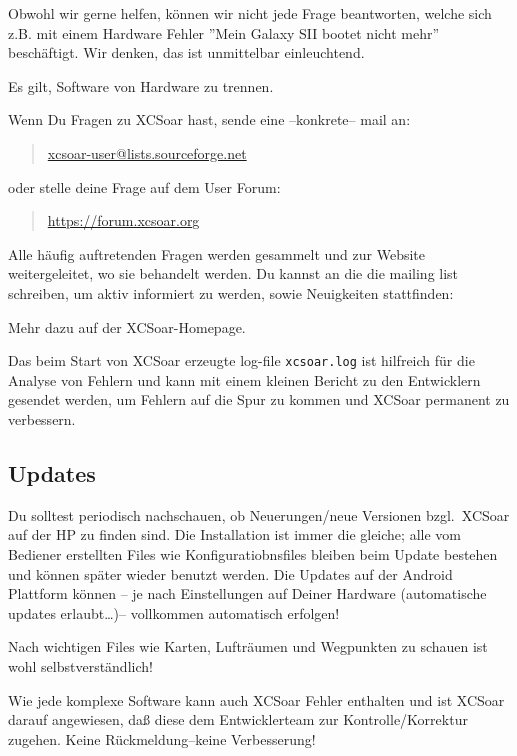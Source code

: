 Obwohl wir gerne helfen, können wir nicht jede Frage beantworten, welche sich z.B. mit einem 
Hardware Fehler ''Mein  Galaxy SII bootet nicht mehr'' beschäftigt. Wir denken, das ist unmittelbar einleuchtend.

Es gilt, Software von Hardware zu trennen. 

Wenn Du Fragen zu \textsf{XCSoar} hast, sende eine --konkrete-- mail an: 

\begin{quote}
\url{xcsoar-user@lists.sourceforge.net}
\end{quote}
oder stelle deine Frage auf dem User Forum:
\begin{quote}
\url{https://forum.xcsoar.org}
\end{quote}

Alle häufig auftretenden Fragen werden gesammelt und zur Website weitergeleitet, wo sie behandelt werden.
Du kannst an die die mailing list schreiben, um aktiv informiert zu werden, sowie Neuigkeiten stattfinden: 

Mehr dazu auf der \textsf{XCSoar}-Homepage. 
\begin{quote}
\xcsoarwebsite{}
\end{quote}

Das beim Start von \textsf{XCSoar} erzeugte log-file \verb|xcsoar.log| ist hilfreich für die Analyse von Fehlern und kann  
mit einem kleinen Bericht zu den Entwicklern gesendet werden, um Fehlern auf die Spur zu kommen 
und \textsf{XCSoar} permanent zu verbessern. 

\subsection*{Updates}
Du solltest periodisch nachschauen, ob Neuerungen/neue Versionen  bzgl.\ \textsf{XCSoar} auf der HP zu finden sind. 
Die Installation ist immer die gleiche; alle vom Bediener erstellten Files wie Konfiguratiobnsfiles 
bleiben beim Update bestehen und können später wieder benutzt werden. Die Updates auf der Android Plattform können -- je nach Einstellungen auf Deiner Hardware  (automatische updates erlaubt\dots)-- vollkommen automatisch erfolgen! 

Nach wichtigen Files wie Karten, Lufträumen und Wegpunkten zu schauen ist wohl selbstverständlich!


Wie jede komplexe Software kann auch \textsf{XCSoar} Fehler enthalten und ist \textsf{XCSoar} darauf angewiesen, daß diese dem Entwicklerteam zur  Kontrolle/Korrektur zugehen. Keine Rückmeldung--keine Verbesserung!

